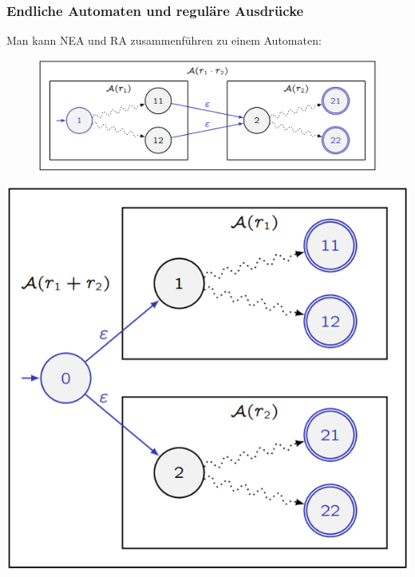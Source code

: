 \documentclass[12pt,a4paper]{article}
\begin{document}
\subsubsection{Endliche Automaten und reguläre Ausdrücke}
Man kann NEA und RA zusammenführen zu einem Automaten:\newline
\begin{center}
	\begin{figure}[!h]
		\includegraphics[width=\textwidth]{Bilder/Konkatenation.png}
	\end{figure}
\end{center}
\begin{minipage}[c]{0.49\textwidth}
	\includegraphics[width=\textwidth]{Bilder/Vereinigung.png}
\end{minipage}
\end{document}
